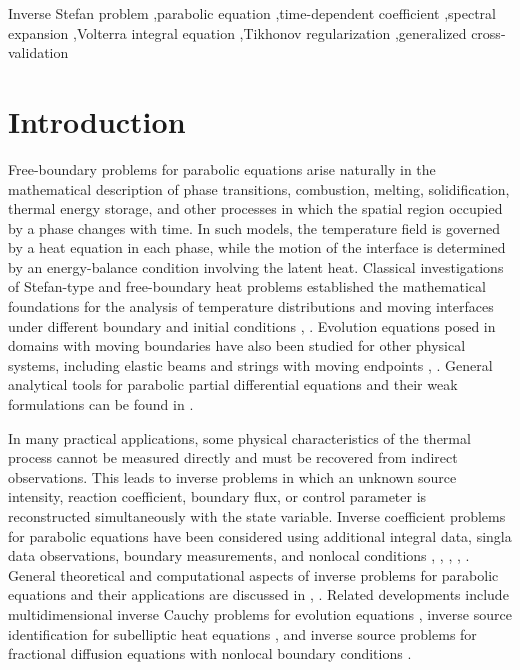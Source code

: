 \documentclass[preprint,12pt,authoryear]{elsarticle}
\begin{document}
\begin{frontmatter}
\begin{keyword}
Inverse Stefan problem \sep parabolic equation \sep time-dependent coefficient \sep spectral expansion \sep Volterra integral equation \sep Tikhonov regularization \sep generalized cross-validation
\end{keyword}

\end{frontmatter}


\section{Introduction}

Free-boundary problems for parabolic equations arise naturally in the mathematical description of phase transitions, combustion, melting, solidification, thermal energy storage, and other processes in which the spatial region occupied by a phase changes with time. In such models, the temperature field is governed by a heat equation in each phase, while the motion of the interface is determined by an energy-balance condition involving the latent heat. Classical investigations of Stefan-type and
free-boundary heat problems established the mathematical foundations for the analysis of temperature distributions and moving interfaces under different boundary and initial conditions \cite{2}, \cite{5}. Evolution equations posed in domains with moving boundaries have also been studied for other physical systems, including elastic beams and strings with moving endpoints \cite{3}, \cite{4}. General analytical tools for parabolic partial differential equations and their weak formulations can be found in \cite{16}.

In many practical applications, some physical characteristics of the thermal process cannot be measured directly and must be recovered from indirect observations. This leads to inverse problems in which an unknown source intensity, reaction coefficient, boundary flux, or control parameter is reconstructed simultaneously with the state variable. Inverse coefficient problems for parabolic equations have been considered using additional integral data, singla data observations, boundary measurements, and
nonlocal conditions \cite{7}, \cite{8}, \cite{9}, \cite{11}, \cite{18}. General theoretical and computational aspects of inverse problems for parabolic equations and their applications are discussed in \cite{12}, \cite{14}. Related developments include multidimensional inverse Cauchy problems for evolution equations \cite{13}, inverse source identification for subelliptic heat equations \cite{15}, and inverse source problems for fractional diffusion equations with nonlocal boundary conditions \cite{19}.
\end{document}
